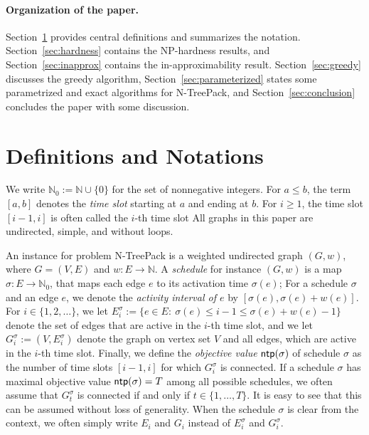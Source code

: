 \documentclass[runningheads]{llncs}
\newcommand{\N}{\mathbb{N}}
\newcommand{\set}[1]{\{ #1 \}}
\newcommand{\fromto}[2]{\set{#1, \ldots, #2}}
\DeclareMathOperator{\ntp}{\text{\sf ntp}}
\newcommand{\xxxNTP}{{\sc N-TreePack}}
\begin{document}
\paragraph{Organization of the paper.}
Section~\ref{sec:notation} provides central definitions and summarizes the notation.
Section~\ref{sec:hardness} contains the NP-hardness results, and 
Section~\ref{sec:inapprox} contains the in-approximability result.
Section~\ref{sec:greedy} discusses the greedy algorithm, 
Section~\ref{sec:parameterized} states some parametrized and exact algorithms for {\xxxNTP}, and
Section~\ref{sec:conclusion} concludes the paper with some discussion.


\section{Definitions and Notations}
\label{sec:notation}
We write $\N_0 := \N \cup \set{0}$ for the set of nonnegative integers. 
For $a\le b$, the term $[a,b]$ denotes the \emph{time slot} starting at $a$ and ending at $b$. 
For $i\ge1$, the time slot $[i-1,i]$ is often called the $i$-th time slot 
All graphs in this paper are undirected, simple, and without loops.

An instance for problem {\xxxNTP} is a weighted undirected graph $(G,w)$, where $G=(V,E)$ and $w:E\to\N$. 
A \emph{schedule} for instance $(G,w)$ is a map $\sigma:E\to\N_0$, that maps each edge $e$ to its activation time $\sigma(e)$;
For a schedule $\sigma$ and an edge $e$, we denote the \emph{activity interval of $e$} by $[\sigma(e),\sigma(e)+w(e)]$. 
For $i\in\{1,2,\ldots\}$, we let $E^\sigma_i:= \set{e\in E:~ \sigma(e)\le i - 1
\le \sigma(e)+w(e)-1}$ denote 
the set of edges that are active in the $i$-th time slot, and we let $G^\sigma_i:= (V, E^\sigma_i)$ denote 
the graph on vertex set $V$ and all edges, which are active in the $i$-th time slot. 
Finally, we define the \emph{objective value} $\ntp(\sigma)$ of schedule $\sigma$ as the number of time 
slots $[i-1,i]$ for which $G^\sigma_i$ is connected. If a schedule $\sigma$ has maximal objective value $\ntp(\sigma) = T$ among all possible schedules, we often assume that $G^\sigma_t$ is connected if and only if $t \in \fromto{1}{T}$. It is easy to see that this can be assumed without loss of generality. When the schedule $\sigma$ is clear from the context, we often simply write $E_i$ and $G_i$ instead of 
$E^\sigma_i$ and $G^\sigma_i$. 
\end{document}
